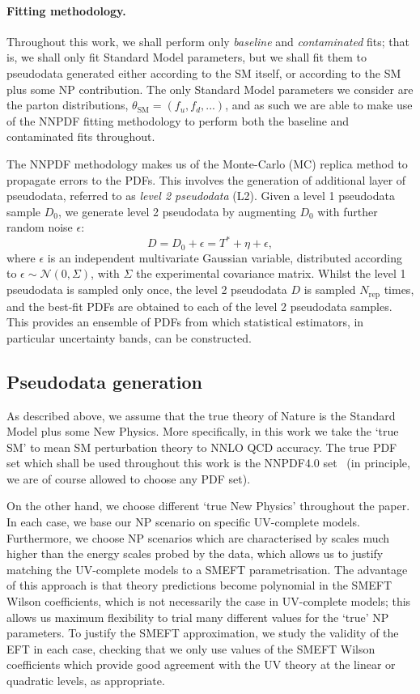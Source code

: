 \documentclass[withindex,glossary]{cam-thesis}
\begin{document}
\paragraph{Fitting methodology.}
Throughout this work, we shall perform only \textit{baseline} and \textit{contaminated} fits; that is, we shall only fit Standard Model parameters, but we shall fit them to pseudodata generated either according to the SM itself, or according to the SM plus some NP contribution. The only Standard Model parameters we consider are the parton distributions, $\theta_{\text{SM}} = (f_u, f_d, ...)$, and as such we are able to make use of the NNPDF fitting methodology to perform both the baseline and contaminated fits throughout.

The NNPDF methodology makes us of the Monte-Carlo (MC) replica method to propagate errors to the PDFs. This involves the generation of additional layer of pseudodata, referred to as \textit{level 2 pseudodata} (L2). Given a level 1 pseudodata sample $D_0$, we generate level 2 pseudodata by augmenting $D_0$ with further random noise $\epsilon$:
\begin{equation}
\label{eq:mc_pseudodata}
D = D_0 + \epsilon = T^* + \eta + \epsilon,
\end{equation}
where $\epsilon$ is an independent multivariate Gaussian variable, distributed according to $\epsilon \sim \mathcal{N}(0,\Sigma)$, with $\Sigma$ the experimental covariance matrix. Whilst the level 1 pseudodata is sampled only once, the level 2 pseudodata $D$ is sampled $N_{\text{rep}}$ times, and the best-fit PDFs are obtained to each of the level 2 pseudodata samples. This provides an ensemble of PDFs from which statistical estimators, in particular uncertainty bands, can be constructed. 

\subsection{Pseudodata generation}
\label{subsec:pseudodata_generation}
As described above, we assume that the true theory of Nature is the Standard Model plus some New Physics. More specifically, in this work we take the `true SM' to mean SM perturbation theory to NNLO QCD accuracy. The true PDF set which shall be used throughout this work is the NNPDF4.0 set~\cite{Ball:2021leu} (in principle, we are of course allowed to choose any PDF set).

On the other hand, we choose different `true New Physics' throughout the paper. In each case, we base our NP scenario on specific UV-complete models. Furthermore, we choose NP scenarios which are characterised by scales much higher than the energy scales probed by the data, which allows us to justify matching the UV-complete models to a SMEFT parametrisation. The advantage of this approach is 
that theory predictions become polynomial in the SMEFT Wilson coefficients, which is not necessarily the case in UV-complete models; this allows
us maximum flexibility to trial many different values for the `true' NP parameters. To justify the SMEFT approximation, we study the validity of the EFT in each case, checking that we only use values of the SMEFT Wilson coefficients which provide good agreement with the UV theory at the linear or quadratic levels, as appropriate.
\end{document}
